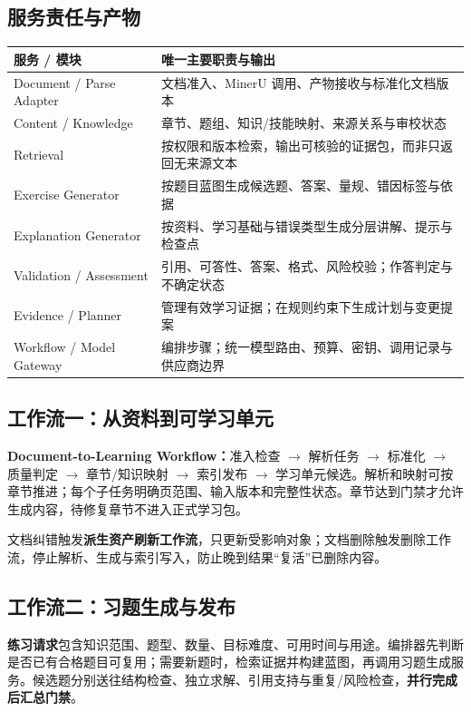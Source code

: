 \documentclass[UTF8,a4paper,11pt,fontset=none]{ctexart}
\newcommand{\cth}[1]{\textbf{\sffamily #1}}
\newcommand{\cont}[1]{\clearpage\noindent{\small\sffamily\color{Muted}#1}\par\vspace{3pt}}
\newenvironment{tbl}{\par\vspace{3pt}\small\noindent\ignorespaces}{\unskip\par\vspace{5pt}}
\begin{document}
\subsection{服务责任与产物}
\begin{tbl}
\begin{tabularx}{\linewidth}{@{}L{33mm}Y@{}}
\toprule
\cth{服务 / 模块}&\cth{唯一主要职责与输出}\\\midrule
Document / Parse Adapter&文档准入、MinerU 调用、产物接收与标准化文档版本\\
Content / Knowledge&章节、题组、知识/技能映射、来源关系与审校状态\\
Retrieval&按权限和版本检索，输出可核验的证据包，而非只返回无来源文本\\
Exercise Generator&按题目蓝图生成候选题、答案、量规、错因标签与依据\\
Explanation Generator&按资料、学习基础与错误类型生成分层讲解、提示与检查点\\
Validation / Assessment&引用、可答性、答案、格式、风险校验；作答判定与不确定状态\\
Evidence / Planner&管理有效学习证据；在规则约束下生成计划与变更提案\\
Workflow / Model Gateway&编排步骤；统一模型路由、预算、密钥、调用记录与供应商边界\\
\bottomrule
\end{tabularx}
\end{tbl}

\cont{9 / 微服务架构与业务编排（续）}
\subsection{工作流一：从资料到可学习单元}
\textbf{Document-to-Learning Workflow：}准入检查 $\rightarrow$ 解析任务 $\rightarrow$ 标准化 $\rightarrow$ 质量判定 $\rightarrow$ 章节/知识映射 $\rightarrow$ 索引发布 $\rightarrow$ 学习单元候选。解析和映射可按章节推进；每个子任务明确页范围、输入版本和完整性状态。章节达到门禁才允许生成内容，待修复章节不进入正式学习包。

文档纠错触发\textbf{派生资产刷新工作流}，只更新受影响对象；文档删除触发删除工作流，停止解析、生成与索引写入，防止晚到结果“复活”已删除内容。

\subsection{工作流二：习题生成与发布}
\textbf{练习请求}包含知识范围、题型、数量、目标难度、可用时间与用途。编排器先判断是否已有合格题目可复用；需要新题时，检索证据并构建蓝图，再调用习题生成服务。候选题分别送往结构检查、独立求解、引用支持与重复/风险检查，\textbf{并行完成后汇总门禁}。
\end{document}
